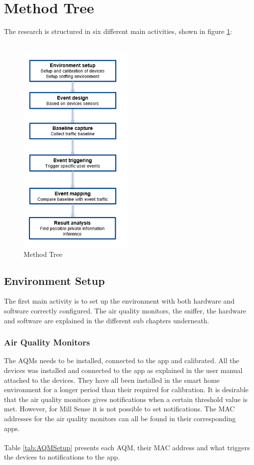 \section{Method Tree}
The research is structured in six different main activities, shown in figure \ref{fig:MethodTree}:
\\\\
\begin{figure} [H]
    \centering
    \includegraphics[width=0.5\textwidth]{figures/MethodTree.png}
    \caption{Method Tree}
    \label{fig:MethodTree}
\end{figure}
\subsection{Environment Setup}
The first main activity is to set up the environment with both hardware and software correctly configured. The air quality monitors, the sniffer, the hardware and software are explained in the different sub chapters underneath. 
\subsubsection{Air Quality Monitors}
The AQMs needs to be installed, connected to the app and calibrated. All the devices was installed and connected to the app as explained in the user manual attached to the devices. They have all been installed in the smart home environment for a longer period than their required for calibration. It is desirable that the air quality monitors gives notifications when a certain threshold value is met. However, for Mill Sense it is not possible to set notifications. The MAC addresses for the air quality monitors can all be found in their corresponding apps. 
\\\\
Table \ref{tab:AQMSetup} presents each AQM, their MAC address and what triggers the devices to notifications to the app. 

